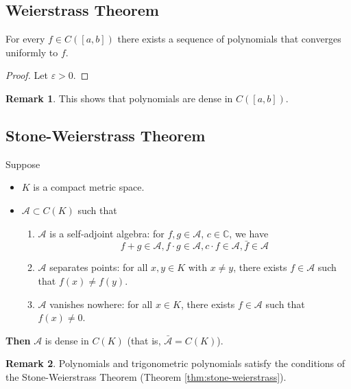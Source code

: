 \documentclass[11pt]{article}
\numberwithin{equation}{section}
\theoremstyle{definition}
\theoremstyle{definition}
\newtheorem*{remark}{Remark}
\def\ss{\subset}
\newcommand{\1}{\mathbbm 1}
\newcommand{\e}{\varepsilon}
\newcommand{\CC}{\mathbb C}
\newcommand{\aA}{\mathcal A}
\begin{document}
\subsection{Weierstrass Theorem}

\begin{theorem}
	For every $f \in C([a,b])$ there exists a sequence of polynomials that converges uniformly to $f$. 
\end{theorem}
\begin{proof}
	Let $\e > 0$. 

\end{proof}


\begin{remark}
	This shows that polynomials are dense in $C([a,b])$. 
\end{remark}


\subsection{Stone-Weierstrass Theorem}

\begin{theorem}\label{thm:stone-weierstrass}
	Suppose 
	\begin{itemize}
		\item $K$ is a compact metric space.
		\item $\aA \ss C(K)$ such that
		\begin{enumerate}
			\item $\aA$ is a self-adjoint algebra: for $f,g \in \aA$, $c \in \CC$, we have
			\begin{equation}
				f+g \in \aA, f \cdot g \in \aA, c \cdot f \in \aA, \bar{f} \in \aA
			\end{equation}
			\item $\aA$ separates points: for all $x,y \in K$ with $x \neq y$, there exists $f \in \aA$ such that $f(x) \neq f(y)$. 
			\item $\aA$ vanishes nowhere: for all $x \in K$, there exists $f \in \aA$ such that $f(x) \neq 0$. 
		\end{enumerate}
	\end{itemize}
	\textbf{Then} $\aA$ is dense in $C(K)$ (that is, $\bar{\aA} = C(K)$). 
\end{theorem}

\begin{remark}
	Polynomials and trigonometric polynomials satisfy the conditions of the Stone-Weierstrass Theorem (Theorem \ref{thm:stone-weierstrass}).

\end{remark}
\end{document}
